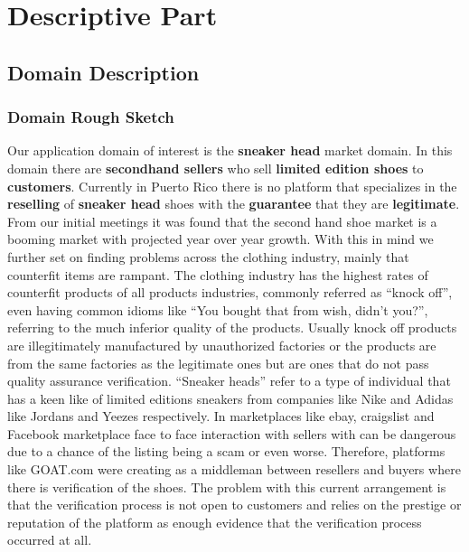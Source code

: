 \chapter{Descriptive Part}
\newpage
\section{Domain Description}
\subsection{Domain Rough Sketch}
Our application domain of interest is the \textbf{sneaker head} market domain. In this domain there are \textbf{secondhand sellers} who sell \textbf{limited edition shoes} to \textbf{customers}. Currently in Puerto Rico there is no platform that specializes in the \textbf{reselling} of \textbf{sneaker head} shoes with the \textbf{guarantee} that they are \textbf{legitimate}. From our initial meetings it was found that the second hand shoe market is a booming market with projected year over year growth. With this in mind we further set on finding problems across the clothing industry, mainly that counterfit items are rampant. The clothing industry has the highest rates of counterfit products of all products industries, commonly referred as ``knock off'', even having common idioms like ``You bought that from wish, didn't you?'', referring to the much inferior quality of the products. Usually knock off products are illegitimately manufactured by unauthorized factories or the products are from the same factories as the legitimate ones but are ones that do not pass quality assurance verification. ``Sneaker heads'' refer to a type of individual that has a keen like of limited editions sneakers from companies like Nike and Adidas like Jordans and Yeezes respectively.  In marketplaces like ebay, craigslist and Facebook marketplace face to face interaction with sellers with can be dangerous due to a chance of the listing being a scam or even worse. Therefore, platforms like GOAT.com were creating as a middleman between resellers and buyers where there is verification of the shoes. The problem with this current arrangement is that the verification process is not open to customers and relies on the prestige or reputation of the platform as enough evidence that the verification process occurred at all.
